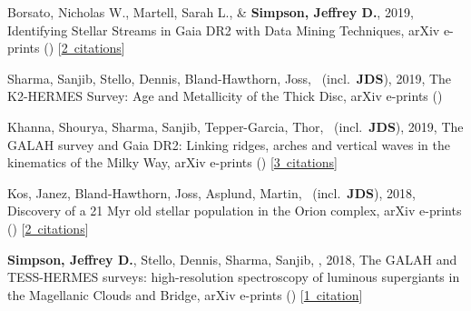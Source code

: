 \item[{\color{numcolor}\scriptsize5}] Borsato, Nicholas W., Martell, Sarah L., \& \textbf{Simpson, Jeffrey D.}, 2019, Identifying Stellar Streams in Gaia DR2 with Data Mining Techniques, arXiv e-prints () [\href{https://ui.adsabs.harvard.edu/#abs/2019arXiv190702527B}{2~citations}]

\item[{\color{numcolor}\scriptsize4}] Sharma, Sanjib, Stello, Dennis, Bland-Hawthorn, Joss, \etal\ (incl.\ \textbf{JDS}), 2019, The K2-HERMES Survey: Age and Metallicity of the Thick Disc, arXiv e-prints ()

\item[{\color{numcolor}\scriptsize3}] Khanna, Shourya, Sharma, Sanjib, Tepper-Garcia, Thor, \etal\ (incl.\ \textbf{JDS}), 2019, The GALAH survey and Gaia DR2: Linking ridges, arches and vertical waves in the kinematics of the Milky Way, arXiv e-prints () [\href{https://ui.adsabs.harvard.edu/#abs/2019arXiv190210113K}{3~citations}]

\item[{\color{numcolor}\scriptsize2}] Kos, Janez, Bland-Hawthorn, Joss, Asplund, Martin, \etal\ (incl.\ \textbf{JDS}), 2018, Discovery of a 21 Myr old stellar population in the Orion complex, arXiv e-prints () [\href{https://ui.adsabs.harvard.edu/#abs/2018arXiv181111762K}{2~citations}]

\item[{\color{numcolor}\scriptsize1}] \textbf{Simpson, Jeffrey D.}, Stello, Dennis, Sharma, Sanjib, \etal, 2018, The GALAH and TESS-HERMES surveys: high-resolution spectroscopy of luminous supergiants in the Magellanic Clouds and Bridge, arXiv e-prints () [\href{https://ui.adsabs.harvard.edu/#abs/2018arXiv180405900S}{1~citation}]